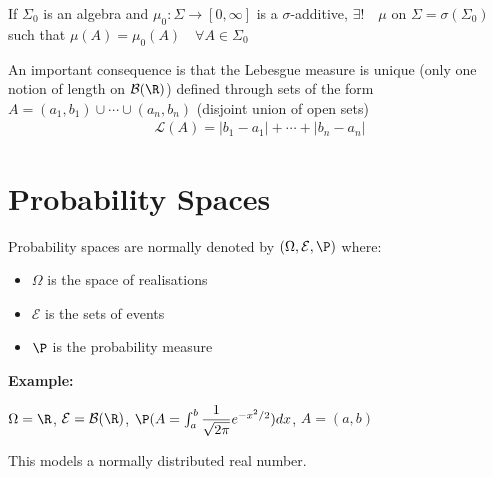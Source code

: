 \begin{theo}{}
  If $\Sigma_0$ is an algebra and $\mu_0:\Sigma\to[0,\infty]$ is a $\sigma$-additive, $\exists!\quad\mu$ on $\Sigma=\sigma(\Sigma_0)$ such that $\mu(A) = \mu_0(A)\quad\forall A\in\Sigma_0$
\end{theo}
\par\bigskip
\noindent An important consequence is that the Lebesgue measure is unique (only one notion of length on $\mathcal{B}(\R)$) defined through sets of the form $A = (a_1,b_1)\cup\cdots\cup(a_n,b_n)$ (disjoint union of open sets)
\begin{equation*}
  \begin{gathered}
    \mathcal{L}(A) = \left|b_1-a_1\right|+\cdots+\left|b_n-a_n\right|
  \end{gathered}
\end{equation*}
\par\bigskip
\section{Probability Spaces}
\noindent Probability spaces are normally denoted by $(\Omega,\mathcal{E}, \P)$ where:\par
\begin{itemize}
  \item $\Omega$ is the space of realisations
  \item $\mathcal{E}$ is the sets of events
  \item $\P$ is the probability measure
\end{itemize}
\par\bigskip
\noindent\textbf{Example:}\par
\noindent $\Omega = \R$, $\mathcal{E} = \mathcal{B}(\R)$, $\P(A = \int_{a}^{b}\dfrac{1}{\sqrt{2\pi}}e^{-x^2/2})dx$, $A = (a,b)$\par
\noindent This models a normally distributed real number.
\par\bigskip
